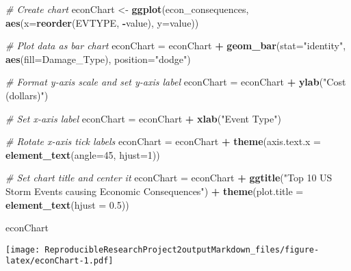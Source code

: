 \documentclass[
]{article}
\newenvironment{Shaded}{\begin{snugshade}}{\end{snugshade}}
\newcommand{\CommentTok}[1]{\textcolor[rgb]{0.56,0.35,0.01}{\textit{#1}}}
\newcommand{\DataTypeTok}[1]{\textcolor[rgb]{0.13,0.29,0.53}{#1}}
\newcommand{\DecValTok}[1]{\textcolor[rgb]{0.00,0.00,0.81}{#1}}
\newcommand{\FloatTok}[1]{\textcolor[rgb]{0.00,0.00,0.81}{#1}}
\newcommand{\KeywordTok}[1]{\textcolor[rgb]{0.13,0.29,0.53}{\textbf{#1}}}
\newcommand{\NormalTok}[1]{#1}
\newcommand{\OperatorTok}[1]{\textcolor[rgb]{0.81,0.36,0.00}{\textbf{#1}}}
\newcommand{\StringTok}[1]{\textcolor[rgb]{0.31,0.60,0.02}{#1}}
\begin{document}
\begin{Shaded}
\begin{Highlighting}[]
\CommentTok{# Create chart}
\NormalTok{econChart <-}\StringTok{ }\KeywordTok{ggplot}\NormalTok{(econ_consequences, }\KeywordTok{aes}\NormalTok{(}\DataTypeTok{x=}\KeywordTok{reorder}\NormalTok{(EVTYPE, }\OperatorTok{-}\NormalTok{value), }\DataTypeTok{y=}\NormalTok{value))}

\CommentTok{# Plot data as bar chart}
\NormalTok{econChart =}\StringTok{ }\NormalTok{econChart }\OperatorTok{+}\StringTok{ }\KeywordTok{geom_bar}\NormalTok{(}\DataTypeTok{stat=}\StringTok{"identity"}\NormalTok{, }\KeywordTok{aes}\NormalTok{(}\DataTypeTok{fill=}\NormalTok{Damage_Type), }\DataTypeTok{position=}\StringTok{"dodge"}\NormalTok{)}

\CommentTok{# Format y-axis scale and set y-axis label}
\NormalTok{econChart =}\StringTok{ }\NormalTok{econChart }\OperatorTok{+}\StringTok{ }\KeywordTok{ylab}\NormalTok{(}\StringTok{"Cost (dollars)"}\NormalTok{) }

\CommentTok{# Set x-axis label}
\NormalTok{econChart =}\StringTok{ }\NormalTok{econChart }\OperatorTok{+}\StringTok{ }\KeywordTok{xlab}\NormalTok{(}\StringTok{"Event Type"}\NormalTok{) }

\CommentTok{# Rotate x-axis tick labels }
\NormalTok{econChart =}\StringTok{ }\NormalTok{econChart }\OperatorTok{+}\StringTok{ }\KeywordTok{theme}\NormalTok{(}\DataTypeTok{axis.text.x =} \KeywordTok{element_text}\NormalTok{(}\DataTypeTok{angle=}\DecValTok{45}\NormalTok{, }\DataTypeTok{hjust=}\DecValTok{1}\NormalTok{))}

\CommentTok{# Set chart title and center it}
\NormalTok{econChart =}\StringTok{ }\NormalTok{econChart }\OperatorTok{+}\StringTok{ }\KeywordTok{ggtitle}\NormalTok{(}\StringTok{"Top 10 US Storm Events causing Economic Consequences"}\NormalTok{) }\OperatorTok{+}\StringTok{ }\KeywordTok{theme}\NormalTok{(}\DataTypeTok{plot.title =} \KeywordTok{element_text}\NormalTok{(}\DataTypeTok{hjust =} \FloatTok{0.5}\NormalTok{))}

\NormalTok{econChart}
\end{Highlighting}
\end{Shaded}

\texttt{[image: ReproducibleResearchProject2outputMarkdown\_files/figure-latex/econChart-1.pdf]}
\end{document}
